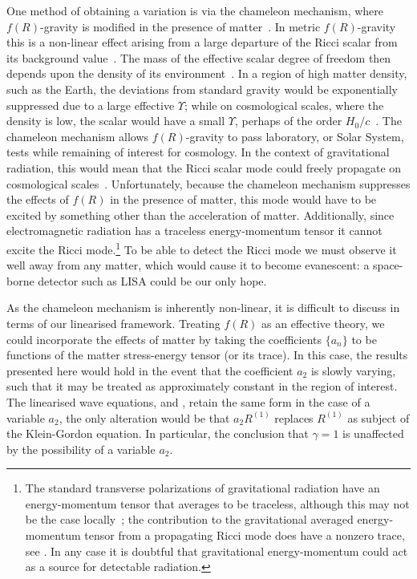 One method of obtaining a variation is via the chameleon mechanism, where $f(R)$-gravity is modified in the presence of matter~\cite{Khoury2004, Khoury2004a, Brax2004}. In metric $f(R)$-gravity this is a non-linear effect arising from a large departure of the Ricci scalar from its background value~\cite{DeFelice2010}. The mass of the effective scalar degree of freedom then depends upon the density of its environment~\cite{Faulkner2007, Li2007}. In a region of high matter density, such as the Earth, the deviations from standard gravity would be exponentially suppressed due to a large effective $\Upsilon$; while on cosmological scales, where the density is low, the scalar would have a small $\Upsilon$, perhaps of the order $H_0/c$~\cite{Khoury2004, Khoury2004a}. The chameleon mechanism allows $f(R)$-gravity to pass laboratory, or Solar System, tests while remaining of interest for cosmology. In the context of gravitational radiation, this would mean that the Ricci scalar mode could freely propagate on cosmological scales~\cite{Corda2009}. Unfortunately, because the chameleon mechanism suppresses the effects of $f(R)$ in the presence of matter, this mode would have to be excited by something other than the acceleration of matter. Additionally, since electromagnetic radiation has a traceless energy-momentum tensor it cannot excite the Ricci mode.\footnote{The standard transverse polarizations of gravitational radiation have an energy-momentum tensor that averages to be traceless, although this may not be the case locally~\cite{Butcher2010}; the contribution to the gravitational averaged energy-momentum tensor from a propagating Ricci mode does have a nonzero trace, see . In any case it is doubtful that gravitational energy-momentum could act as a source for detectable radiation.} To be able to detect the Ricci mode we must observe it well away from any matter, which would cause it to become evanescent: a space-borne detector such as LISA could be our only hope.

As the chameleon mechanism is inherently non-linear, it is difficult to discuss in terms of our linearised framework. Treating $f(R)$ as an effective theory, we could incorporate the effects of matter by taking the coefficients $\{a_n\}$ to be functions of the matter stress-energy tensor (or its trace). In this case, the results presented here would hold in the event that the coefficient $a_2$ is slowly varying, such that it may be treated as approximately constant in the region of interest. The linearised wave equations,  and , retain the same form in the case of a variable $a_2$, the only alteration would be that $a_2 R^{(1)}$ replaces $R^{(1)}$ as subject of the Klein-Gordon equation. In particular, the conclusion that $\gamma =1$ is unaffected by the possibility of a variable $a_2$.

